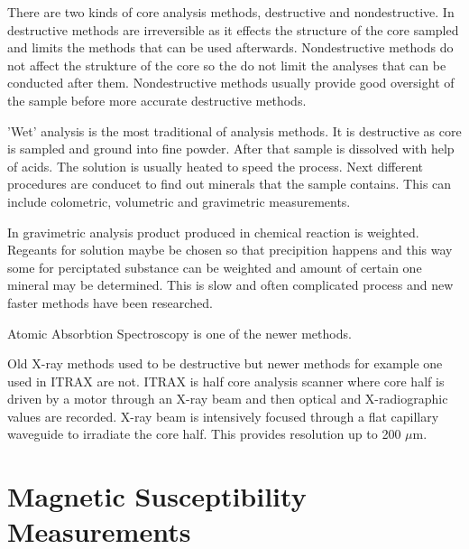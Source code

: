 \documentclass[12pt,a4paper,oneside,pdftex]{report}
\begin{document}
There are two kinds of core analysis methods, destructive and nondestructive. In destructive methods
are irreversible as it effects the structure of the core sampled and limits the methods that can be used
afterwards. Nondestructive methods do not affect the strukture of the core so the do not limit the 
analyses that can be conducted after them. Nondestructive methods usually provide good oversight of the
sample before more accurate destructive methods.

'Wet' analysis is the most traditional of analysis methods. It is destructive as core is sampled and 
ground into fine powder. After that sample is dissolved with help of acids. The solution is 
usually heated to speed the process. Next different procedures are conducet to find out minerals that the sample
contains. This can include colometric, volumetric and gravimetric measurements.\cite{Klein1993}

In gravimetric analysis product produced in chemical reaction is weighted. Regeants for solution maybe be chosen
so that precipition happens and this way some for perciptated substance can be weighted and amount of certain one
mineral may be determined. This is slow and often complicated process and new faster methods have been 
researched.\cite{Klein1993}

Atomic Absorbtion Spectroscopy is one of the newer methods.

Old X-ray methods used to be destructive \cite{Croudace2006} but newer methods for 
example one used in ITRAX \cite{Croudace2006} are not. ITRAX is half core analysis scanner where core half is 
driven by a motor through an X-ray beam and then optical and X-radiographic values are recorded. 
X-ray beam is intensively focused through a flat capillary waveguide to irradiate the core half. 
This provides resolution up to 200 $\mu$m.\cite{Croudace2006}



\section{Magnetic Susceptibility Measurements}
\end{document}
